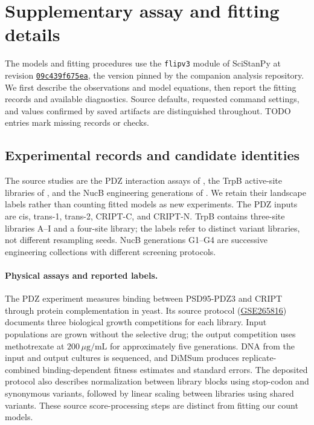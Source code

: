 \section{Supplementary assay and fitting details}
\label{app:fit-details}

The models and fitting procedures use the \texttt{flipv3} module of
SciStanPy at revision
\href{https://github.com/microsoft/SciStanPy/tree/09c439f675ead70f851d814242f153ecb7712113/flipv3}{\texttt{09c439f675ea}},
the version pinned by the companion analysis repository. We first describe
the observations and model equations, then report the fitting records and
available diagnostics. Source defaults, requested command settings, and
values confirmed by saved artifacts are distinguished throughout. TODO
entries mark missing records or checks.

\subsection{Experimental records and candidate identities}
\label{app:experimental-records}

The source studies are the PDZ interaction assays of \citet{zarin2024}, the
TrpB active-site libraries of \citet{johnston2024}, and the NucB engineering
generations of \citet{thomas2025}. We retain their landscape labels rather
than counting fitted models as new experiments. The PDZ inputs
are cis, trans-1, trans-2, CRIPT-C, and CRIPT-N. TrpB contains three-site
libraries A--I and a four-site library; the labels refer to distinct variant
libraries, not different resampling seeds. NucB generations G1--G4 are
successive engineering collections with different screening protocols.

\paragraph{Physical assays and reported labels.}
The PDZ experiment measures binding between PSD95-PDZ3 and CRIPT through
protein complementation in yeast. Its source protocol
(\href{https://www.ncbi.nlm.nih.gov/geo/query/acc.cgi?acc=GSE265816}{GSE265816})
documents three biological growth competitions for each library. Input
populations are grown without the selective drug; the output competition
uses methotrexate at $200\,\mu\mathrm{g}/\mathrm{mL}$ for approximately five
generations. DNA from the input and output cultures is sequenced, and DiMSum
produces replicate-combined binding-dependent fitness estimates and standard
errors. The deposited protocol also describes normalization between library
blocks using stop-codon and synonymous variants, followed by linear scaling
between libraries using shared variants. These source score-processing steps
are distinct from fitting our count models.

